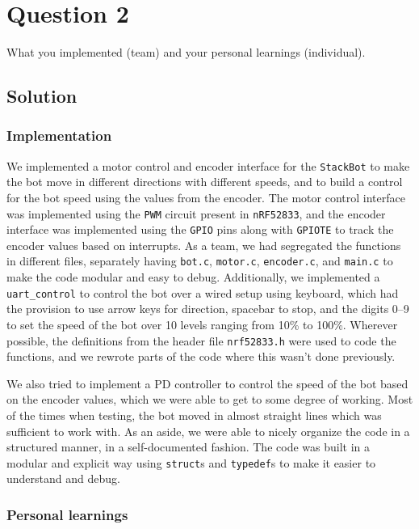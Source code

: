 \section*{Question 2}

What you implemented (team) and your personal learnings (individual).

\subsection*{Solution}

\subsubsection*{Implementation}

We implemented a motor control and encoder interface for the \texttt{StackBot} to make the bot move in different directions with different speeds, and to build a control for the bot speed using the values from the encoder.
The motor control interface was implemented using the \texttt{PWM} circuit present in \texttt{nRF52833}, and the encoder interface was implemented using the \texttt{GPIO} pins along with \texttt{GPIOTE} to track the encoder values based on interrupts.
As a team, we had segregated the functions in different files, separately having \texttt{bot.c}, \texttt{motor.c}, \texttt{encoder.c}, and \texttt{main.c} to make the code modular and easy to debug.
Additionally, we implemented a \texttt{uart\_control} to control the bot over a wired setup using keyboard, which had the provision to use arrow keys for direction, spacebar to stop, and the digits 0--9 to set the speed of the bot over 10 levels ranging from 10\% to 100\%.
Wherever possible, the definitions from the header file \texttt{nrf52833.h} were used to code the functions, and we rewrote parts of the code where this wasn't done previously.

We also tried to implement a PD controller to control the speed of the bot based on the encoder values, which we were able to get to some degree of working.
Most of the times when testing, the bot moved in almost straight lines which was sufficient to work with.
As an aside, we were able to nicely organize the code in a structured manner, in a self-documented fashion.
The code was built in a modular and explicit way using \texttt{struct}s and \texttt{typedef}s to make it easier to understand and debug.

\subsubsection*{Personal learnings}

